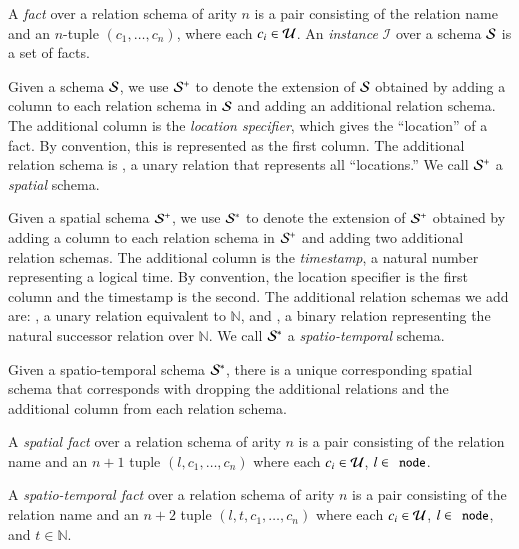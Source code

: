 
A {\em fact} over a relation schema of arity $n$ is a pair consisting of the
relation name and an $n$-tuple $(c_1,\ldots,c_n)$, where each $c_i \in
\univ$.  An \emph{instance} $\mathcal{I}$ over a schema $\schema$ is a
set of facts. 

  Given a schema $\schema$, we use
$\sschema$ to denote the extension of $\schema$ obtained by adding a column to
each relation schema in $\schema$ and adding an additional relation schema.  The
additional column is the {\em location specifier}, which gives the ``location''
of a fact.  By convention, this is represented as the first column.  The
additional relation schema is , a unary relation that represents
all ``locations.''  We call $\sschema$ a {\em spatial} schema.


Given a spatial schema $\sschema$, we use $\stschema$ to denote the extension of
$\sschema$ obtained by adding a column to each relation schema in $\sschema$ and
adding two additional relation schemas. 
The additional column is the {\em timestamp}, a natural number representing a
logical time.  By convention, the location specifier is the first column and the
timestamp is the second.  The additional relation schemas we add are:
, a unary relation equivalent to $\mathbb{N}$, and ,
a binary relation representing the natural successor relation over $\mathbb{N}$.
We call $\stschema$ a {\em spatio-temporal} schema. 

Given a spatio-temporal schema $\stschema$, there is a unique corresponding
spatial schema that corresponds with dropping the additional relations and the
additional column from each relation schema. 

A {\em spatial fact} over a relation schema of arity $n$ is a pair consisting of the relation name and an $n+1$ tuple $(l,c_1,\ldots,c_n)$ where each $c_i \in \univ$, $l \in \dedalus{node}$.

A {\em spatio-temporal fact} over a relation schema of arity $n$ is a pair consisting of the relation name and an $n+2$ tuple $(l,t,c_1,\ldots,c_n)$ where each $c_i \in \univ$, $l \in \dedalus{node}$, and $t \in \mathbb{N}$.

